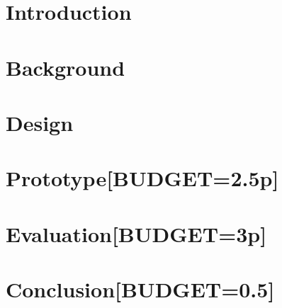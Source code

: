 \section{Introduction}
\label{sec:intro}




\section{Background}
\label{sec:background}


\section{\tcpls Design}
\label{sec:background-design}




\section{\tcpls Prototype[BUDGET=2.5p]}
\label{sec:prototype}



\section{\tcpls Evaluation[BUDGET=3p]}
\label{sec:evaluation}


\section{Conclusion[BUDGET=0.5]}
\label{sec:conclusion}




%


%


